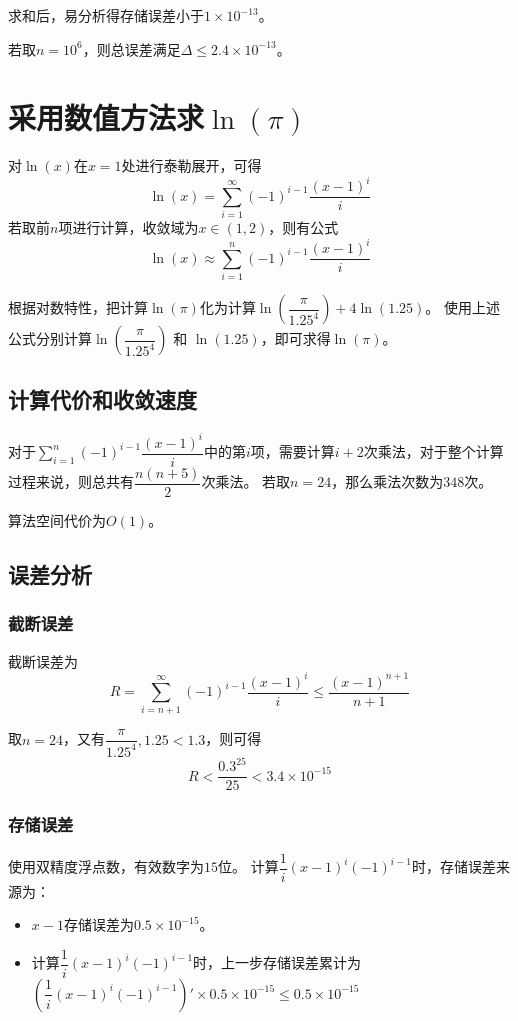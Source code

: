 \documentclass[11pt,a4paper]{ctexart}
\begin{document}
求和后，易分析得存储误差小于$1\times10^{-13}$。

若取$n = 10^6$，则总误差满足$\Delta \le 2.4 \times 10^{-13}$。

\section{采用数值方法求$\ln(\pi)$}
对$\ln(x)$在$x = 1$处进行泰勒展开，可得
$$\ln(x) = \sum\limits_{i = 1}^{\infty} (-1)^{i-1} \dfrac{(x-1)^i}{i}$$
若取前$n$项进行计算，收敛域为$x \in (1, 2)$，则有公式
$$\ln(x) \approx \sum\limits_{i = 1}^{n} (-1)^{i-1} \dfrac{(x-1)^i}{i}$$

根据对数特性，把计算$\ln(\pi)$化为计算$\ln(\dfrac{\pi}{1.25^4}) + 4\ln(1.25)$。
使用上述公式分别计算$\ln(\dfrac{\pi}{1.25^4})$ 和 $\ln(1.25)$，即可求得$\ln(\pi)$。

\subsection{计算代价和收敛速度}
对于$\sum\limits_{i = 1}^{n} (-1)^{i-1} \dfrac{(x-1)^i}{i}$中的第$i$项，需要计算$i+2$次乘法，对于整个计算过程来说，则总共有$\dfrac{n(n+5)}{2}$次乘法。
若取$n=24$，那么乘法次数为$348$次。

算法空间代价为$O(1)$。

\subsection{误差分析}
\subsubsection{截断误差}
截断误差为
$$R = \sum\limits_{i = n+1}^{\infty} (-1)^{i-1} \dfrac{(x-1)^i}{i} \le \dfrac{(x-1)^{n+1}}{n+1}$$

取$n=24$，又有$\dfrac{\pi}{1.25^4}, 1.25 < 1.3$，则可得
$$R < \dfrac{0.3^{25}}{25} < 3.4\times 10^{-15}$$

\subsubsection{存储误差}
使用双精度浮点数，有效数字为$15$位。
计算$\dfrac{1}{i}(x-1)^i(-1)^{i-1}$时，存储误差来源为：
\begin{itemize}
    \item $x-1$存储误差为$0.5\times 10^{-15}$。
    \item 计算$\dfrac{1}{i}(x-1)^i(-1)^{i-1}$时，上一步存储误差累计为$\left(\dfrac{1}{i}(x-1)^i(-1)^{i-1}\right)' \times 0.5\times 10^{-15} \le 0.5\times 10^{-15}$
\end{itemize}
\end{document}
